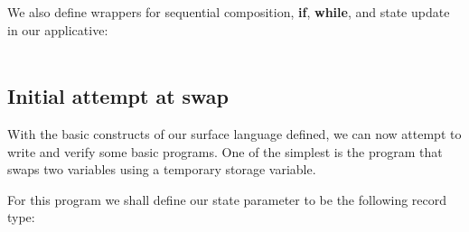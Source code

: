 \documentclass[sigplan,review]{acmart}\settopmatter{printfolios=true,printccs=false,printacmref=false}
\begin{document}
We also define wrappers for sequential composition, \textbf{if}, \textbf{while}, and state update in our  applicative:
\\[-0.5em]

\noindent {}\AgdaSpace{}%
\AgdaSpace{}%
\AgdaSpace{}%
\AgdaSymbol{=}\AgdaSpace{}%
\AgdaSpace{}%
\AgdaSpace{}%
\AgdaSpace{}%
\AgdaSpace{}%
\\[-0.5em]

\noindent {}\AgdaSpace{}%
\AgdaSpace{}%
\AgdaSpace{}%
\AgdaSpace{}%
\AgdaSpace{}%
\AgdaSpace{}%
\AgdaSpace{}%
\AgdaSymbol{=}\AgdaSpace{}%
\AgdaSpace{}%
\AgdaSymbol{(}\AgdaSpace{}%
\AgdaSymbol{)}\AgdaSpace{}%
\AgdaSpace{}%
\AgdaSpace{}%
%
\begin{code}
\>[2]\AgdaSpace{}%
\AgdaSpace{}%
\AgdaSpace{}%
\AgdaSpace{}%
\AgdaSpace{}%
\AgdaSymbol{=}\AgdaSpace{}%
\AgdaSpace{}%
\AgdaSymbol{(}\AgdaSpace{}%
\AgdaSymbol{)}\AgdaSpace{}%
\AgdaSpace{}%
\<%
\end{code}

\noindent {}\AgdaSpace{}%
\AgdaSpace{}%
\AgdaSymbol{=}\AgdaSpace{}%
\AgdaSpace{}%
\AgdaSymbol{(}\AgdaSpace{}%
\AgdaSymbol{)}

\subsection{Initial attempt at swap}

With the basic constructs of our surface language defined, we can now 
attempt to write and verify some basic programs. One of the simplest
is the program that swaps two variables using a temporary storage variable.

For this program we shall define our state parameter to be the following record type:
\end{document}
